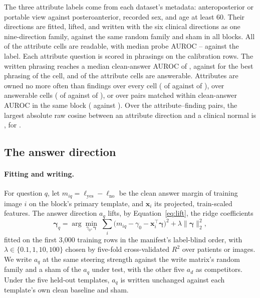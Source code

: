The three attribute labels come from each dataset's metadata: anteroposterior or portable view against posteroanterior, recorded sex, and age at least 60. Their directions are fitted, lifted, and written with the six clinical directions as one nine-direction family, against the same random family and sham in all \cfAttrRefBlocks{} blocks. All \cfAttrReadable{} of the \cfAttrChestAttrN{} attribute cells are readable, with median probe AUROC \cfAttrAurocMin{}--\cfAttrAurocMax{} against the label. Each attribute question is scored in \cfAttrqPhrasings{} phrasings on the calibration rows. The written phrasing reaches a median clean-answer AUROC of \cfAttrqWrittenAuroc{}, against \cfAttrqSelectedAuroc{} for the best phrasing of the cell, and \cfAttrqCapable{} of the \cfAttrqCells{} attribute cells are answerable. Attributes are owned no more often than findings over every cell (\cfAttrChestAttrOwned{} of \cfAttrChestAttrN{} against \cfAttrChestClinOwned{} of \cfAttrChestClinN{}), over answerable cells (\cfAttrCapAttrOwned{} of \cfAttrCapAttrN{} against \cfAttrCapClinOwned{} of \cfAttrCapClinN{}), or over \cfAttrPairAttrN{} pairs matched within \cfAttrPairWindow{} clean-answer AUROC in the same block (\cfAttrPairAttrOwned{} against \cfAttrPairClinOwned{}). Over the \cfAttrCosPairs{} attribute--finding pairs, the largest absolute raw cosine between an attribute direction and a clinical normal is \cfAttrCosMax{}, for \cfAttrCosPairLabel{}.


\subsection{The answer direction}
\label{app:cf-ansdir}

\paragraph{Fitting and writing.} For question $q$, let $m_{iq}=\ell_{\mathrm{yes}}-\ell_{\mathrm{no}}$ be the clean answer margin of training image $i$ on the block's primary template, and $\boldsymbol x_i$ its projected, train-scaled features. The answer direction $a_q$ lifts, by Equation~\ref{eq:lift}, the ridge coefficients
\begin{equation}
\boldsymbol\gamma_q=\arg\min_{\gamma_0,\boldsymbol\gamma}\;\sum_{i}\bigl(m_{iq}-\gamma_0-\boldsymbol x_i^{\top}\boldsymbol\gamma\bigr)^2+\lambda\lVert\boldsymbol\gamma\rVert_2^2 ,
\label{eq:answer-direction}
\end{equation}
fitted on the first 3{,}000 training rows in the manifest's label-blind order, with $\lambda\in\{0.1,1,10,100\}$ chosen by five-fold cross-validated $R^2$ over patients or images. We write $a_q$ at the same steering strength against the write matrix's random family and a sham of the $a_q$ under test, with the other five $a_d$ as competitors. Under the five held-out templates, $a_q$ is written unchanged against each template's own clean baseline and sham.

